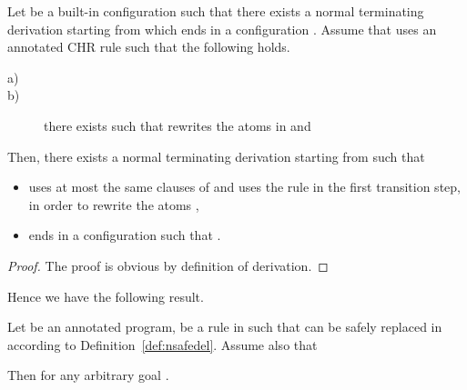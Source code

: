 \documentclass{tlp}
\begin{document}
\begin{proposition}\label{propavanza}
Let  be a built-in configuration such that there exists a normal terminating derivation  starting from  which ends in a configuration . Assume that  uses an annotated CHR rule  such that the following holds.
\begin{description}
        \item[a)] 
        \item[b)]
        there exists  such that  rewrites the atoms  in  and 

      \end{description}
Then, there exists a normal terminating derivation  starting from  such that
\begin{itemize}
  \item  uses at most the same clauses of  and uses the rule  in the first  transition step, in order to rewrite the atoms ,
  \item  ends in a configuration  such that .
\end{itemize}
\end{proposition}
\begin{proof}
The proof is obvious by definition of derivation.
\end{proof}


\noindent Hence we have the following result.\\
\setcounter{theorem}{0}
\begin{theorem}
Let  be an annotated program,   be a rule in  such that
 can be safely replaced
in  according to Definition~\ref{def:nsafedel}. Assume also that


Then  for any arbitrary
goal .
\end{theorem}
\setcounter{theorem}{3}
\end{document}
